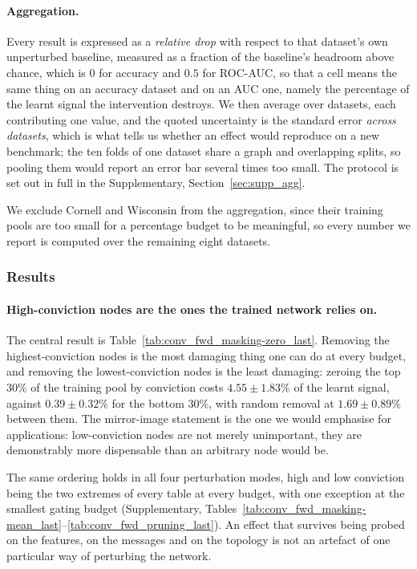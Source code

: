 \paragraph{Aggregation.}
Every result is expressed as a \emph{relative drop} with respect to that
dataset's own unperturbed baseline, measured as a fraction of the baseline's
headroom above chance, which is $0$ for accuracy and $0.5$ for ROC-AUC, so that
a cell means the same thing on an accuracy dataset and on an AUC one, namely the
percentage of the learnt signal the intervention destroys. We then average over
datasets, each contributing one value, and the quoted uncertainty is the
standard error \emph{across datasets}, which is what tells us whether an effect
would reproduce on a new benchmark; the ten folds of one dataset share a graph
and overlapping splits, so pooling them would report an error bar several times
too small. The protocol is set out in full in the Supplementary,
Section~\ref{sec:supp_agg}.

We exclude Cornell and Wisconsin from the aggregation, since their training
pools are too small for a percentage budget to be meaningful, so every number we
report is computed over the remaining eight datasets.

\subsubsection{Results}

\paragraph{High-conviction nodes are the ones the trained network relies on.}
The central result is Table~\ref{tab:conv_fwd_masking-zero_last}. Removing the
highest-conviction nodes is the most damaging thing one can do at every budget,
and removing the lowest-conviction nodes is the least damaging: zeroing the top
$30\%$ of the training pool by conviction costs $4.55 \pm 1.83\%$ of the learnt
signal, against $0.39 \pm 0.32\%$ for the bottom $30\%$, with random removal at
$1.69 \pm 0.89\%$ between them. The mirror-image statement is the one we would
emphasise for applications: low-conviction nodes are not merely unimportant,
they are demonstrably more dispensable than an arbitrary node would be.

The same ordering holds in all four perturbation modes, high and low conviction
being the two extremes of every table at every budget, with one exception at the
smallest gating budget (Supplementary,
Tables~\ref{tab:conv_fwd_masking-mean_last}--\ref{tab:conv_fwd_pruning_last}).
An effect that survives being probed on the features, on the messages and on the
topology is not an artefact of one particular way of perturbing the network.

